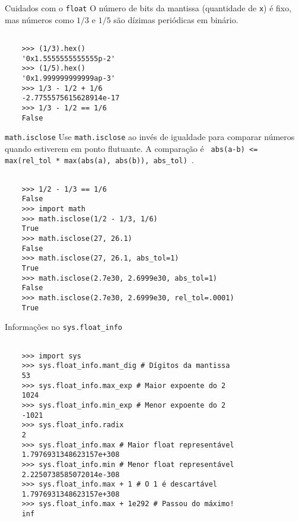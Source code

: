 \documentclass[utf8]{beamer}
\begin{document}
\begin{frame}[fragile]{Cuidados com o \texttt{float}}
  O número de bits da mantissa (quantidade de \texttt{x}) é fixo,
  mas números como $1/3$ e $1/5$ são dízimas periódicas em binário.

  \begin{verbatim}

    >>> (1/3).hex()
    '0x1.5555555555555p-2'
    >>> (1/5).hex()
    '0x1.999999999999ap-3'
    >>> 1/3 - 1/2 + 1/6
    -2.7755575615628914e-17
    >>> 1/3 - 1/2 == 1/6
    False

  \end{verbatim}

\end{frame}


\begin{frame}[fragile]{\texttt{math.isclose}}
  Use \texttt{math.isclose} ao invés de igualdade
  para comparar números quando estiverem em ponto flutuante.
  A comparação é
  \texttt{
    abs(a-b) <= max(rel_tol * max(abs(a), abs(b)), abs_tol)
  }.

  \begin{verbatim}

    >>> 1/2 - 1/3 == 1/6
    False
    >>> import math
    >>> math.isclose(1/2 - 1/3, 1/6)
    True
    >>> math.isclose(27, 26.1)
    False
    >>> math.isclose(27, 26.1, abs_tol=1)
    True
    >>> math.isclose(2.7e30, 2.6999e30, abs_tol=1)
    False
    >>> math.isclose(2.7e30, 2.6999e30, rel_tol=.0001)
    True

  \end{verbatim}
\end{frame}


\begin{frame}[fragile]{Informações no \texttt{sys.float\_info}}

  \begin{verbatim}

    >>> import sys
    >>> sys.float_info.mant_dig # Dígitos da mantissa
    53
    >>> sys.float_info.max_exp # Maior expoente do 2
    1024
    >>> sys.float_info.min_exp # Menor expoente do 2
    -1021
    >>> sys.float_info.radix
    2
    >>> sys.float_info.max # Maior float representável
    1.7976931348623157e+308
    >>> sys.float_info.min # Menor float representável
    2.2250738585072014e-308
    >>> sys.float_info.max + 1 # O 1 é descartável
    1.7976931348623157e+308
    >>> sys.float_info.max + 1e292 # Passou do máximo!
    inf

  \end{verbatim}

\end{frame}
\end{document}
